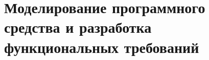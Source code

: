 \section{Моделирование программного средства и разработка функциональных требований}
\label{sec:domain}




